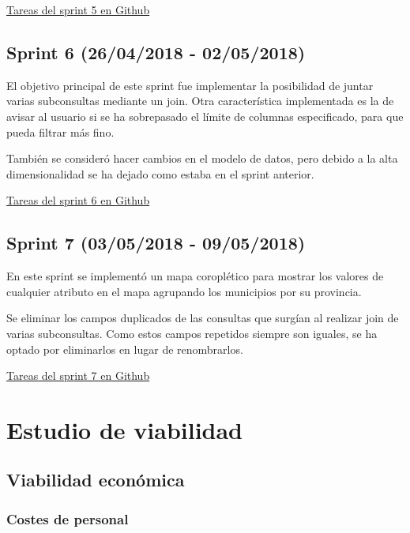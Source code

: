 \href{https://github.com/IvanArjona/TFG-Datos-publicos/milestone/6?closed=1}{Tareas del sprint 5 en Github}

\subsection{Sprint 6 (26/04/2018 - 02/05/2018)}

El objetivo principal de este sprint fue implementar la posibilidad de juntar varias subconsultas mediante un join. Otra característica implementada es la de avisar al usuario si se ha sobrepasado el límite de columnas especificado, para que pueda filtrar más fino.

También se consideró hacer cambios en el modelo de datos, pero debido a la alta dimensionalidad se ha dejado como estaba en el sprint anterior.


\href{https://github.com/IvanArjona/TFG-Datos-publicos/milestone/7?closed=1}{Tareas del sprint 6 en Github}

\subsection{Sprint 7 (03/05/2018 - 09/05/2018)}

En este sprint se implementó un mapa coroplético para mostrar los valores de cualquier atributo en el mapa agrupando los municipios por su provincia.

Se eliminar los campos duplicados de las consultas que surgían al realizar join de varias subconsultas. Como estos campos repetidos siempre son iguales, se ha optado por eliminarlos en lugar de renombrarlos.


\href{https://github.com/IvanArjona/TFG-Datos-publicos/milestone/8?closed=1}{Tareas del sprint 7 en Github}

\section{Estudio de viabilidad}

\subsection{Viabilidad económica}

\subsubsection{Costes de personal}


